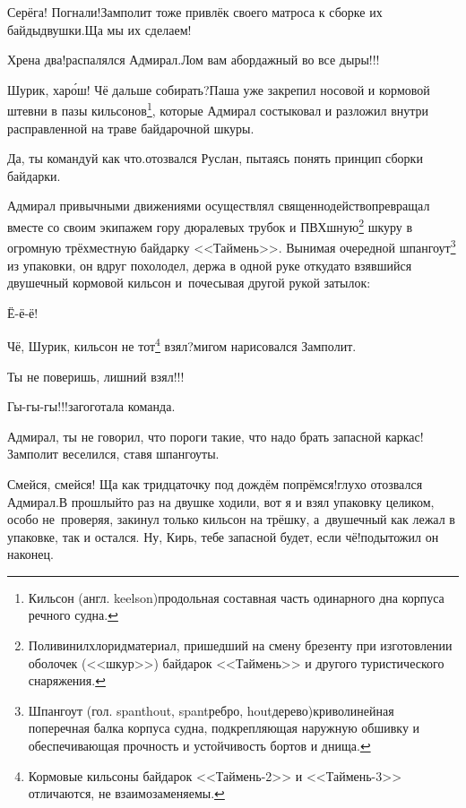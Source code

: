 \diagdash Серёга! Погнали!\mdash Замполит тоже привлёк своего матроса к сборке их байды\sdash двушки.\mdash Ща мы их сделаем!

\diagdash Хрена два!\mdash распалялся Адмирал.\mdash Лом вам абордажный во все дыры!!! 

\diagdash Шурик, хар\'{о}ш! Чё дальше собирать?\mdash Паша уже закрепил носовой и кормовой штевни в пазы кильсонов\footnote{Кильсон (англ. keelson)\mdash продольная составная часть одинарного дна корпуса речного судна\cite{МорскойСправочник}.}, которые Адмирал состыковал и разложил внутри расправленной на траве байдарочной шкуры.

\diagdash Да, ты командуй как что.\mdash отозвался Руслан, пытаясь понять принцип сборки байдарки.

Адмирал привычными движениями осуществлял священнодейство\mdash превращал вместе со своим экипажем гору дюралевых трубок и ПВХ\sdash шную\footnote{Поливинилхлорид\mdash материал, пришедший на смену брезенту при изготовлении оболочек (<<шкур>>) байдарок <<Таймень>> и другого туристического снаряжения.} шкуру в огромную трёхместную байдарку <<Таймень>>. Вынимая очередной шпангоут\footnote{Шпангоут (гол. spanthout, spant\mdash ребро, hout\mdash дерево)\mdash криволинейная поперечная балка корпуса судна, подкрепляющая наружную обшивку и обеспечивающая прочность и устойчивость бортов и днища\cite{МорскойСправочник}.} из упаковки, он вдруг похолодел, держа в одной руке откуда\sdash то взявшийся двушечный кормовой кильсон и~почесывая другой рукой затылок:

\diagdash Ё-ё-ё!

\renewcommand*{\thefootnote}{\arabic{footnote}}
\setcounter{footnote}{0}
\diagdash Чё, Шурик, кильсон не тот\footnote{Кормовые кильсоны байдарок <<Таймень-2>> и <<Таймень-3>> отличаются, не взаимозаменяемы.} взял?\mdash мигом нарисовался Замполит.

\diagdash Ты не поверишь, лишний взял!!!

\diagdash Гы-гы-гы!!!\mdash загоготала команда.

\diagdash Адмирал, ты не говорил, что пороги такие, что надо брать запасной каркас!\mdash Замполит веселился, ставя шпангоуты.

\diagdash Смейся, смейся! Ща как тридцаточку под дождём попрёмся!\mdash глухо отозвался Адмирал.\mdash В прошлый\sdash то раз на двушке ходили, вот я и взял упаковку целиком, особо не~проверяя, закинул только кильсон на трёшку, а~двушечный как лежал в упаковке, так и остался. Ну, Кирь, тебе запасной будет, если чё!\mdash подытожил он наконец.

